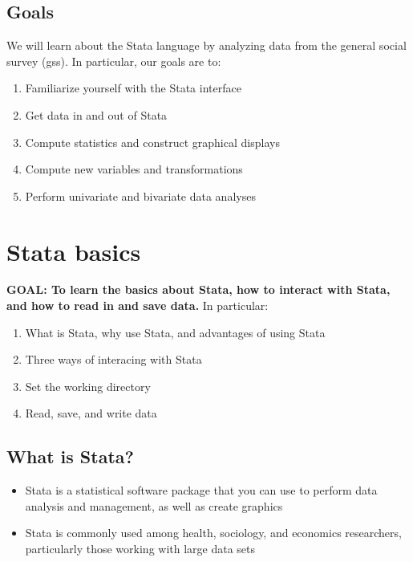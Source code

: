 \documentclass[
]{book}
\providecommand{\tightlist}{%
  \setlength{\itemsep}{0pt}\setlength{\parskip}{0pt}}
\begin{document}
\hypertarget{goals-5}{%
\subsection{Goals}\label{goals-5}}

We will learn about the Stata language by analyzing data from the general social survey (gss).
In particular, our goals are to:

\begin{enumerate}
\def\labelenumi{\arabic{enumi}.}
\tightlist
\item
  Familiarize yourself with the Stata interface
\item
  Get data in and out of Stata
\item
  Compute statistics and construct graphical displays
\item
  Compute new variables and transformations
\item
  Perform univariate and bivariate data analyses
\end{enumerate}

\hypertarget{stata-basics}{%
\section{Stata basics}\label{stata-basics}}

\textbf{GOAL: To learn the basics about Stata, how to interact with Stata, and how to read in and save data.} In particular:

\begin{enumerate}
\def\labelenumi{\arabic{enumi}.}
\tightlist
\item
  What is Stata, why use Stata, and advantages of using Stata
\item
  Three ways of interacing with Stata
\item
  Set the working directory
\item
  Read, save, and write data
\end{enumerate}

\hypertarget{what-is-stata}{%
\subsection{What is Stata?}\label{what-is-stata}}

\begin{itemize}
\tightlist
\item
  Stata is a statistical software package that you can use to perform data analysis and management, as well as create graphics
\item
  Stata is commonly used among health, sociology, and economics researchers, particularly those working with large data sets
\end{itemize}
\end{document}
